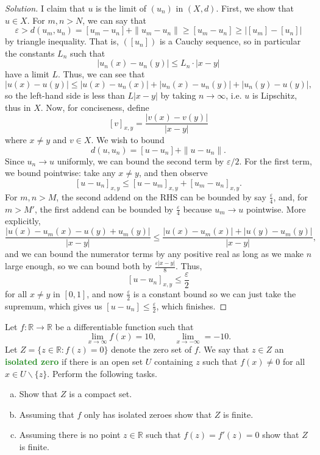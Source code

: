 \documentclass[11pt]{scrartcl}
\providecommand{\eps}{\varepsilon}
\providecommand{\RR}{\mathbb R}
\providecommand{\ii}{\item}
\providecommand{\setdiff}{\smallsetminus}
\newenvironment{soln}{\begin{proof}[Solution]}{\end{proof}}
\providecommand{\vocab}[1]{{\textbf{\textcolor{ForestGreen}{#1}}}}
\begin{document}
\begin{soln}
	I claim that $u$ is the limit of $(u_n)$ in $(X, d)$.
	First, we show that $u\in X$. For $m,n > N$, we can say that
	\[\eps > d(u_m, u_n) = [u_m - u_n] + \|u_m - u_n\|
	\ge [u_m - u_n] \ge |[u_m] - [u_n]|\]
	by triangle inequality. That is, $([u_n])$ is a Cauchy sequence,
	so in particular the constants $L_n$ such that
	\[|u_n(x) - u_n(y)| \le L_n\cdot|x - y|\]
	have a limit $L$. Thus, we can see that
	\[|u(x) - u(y)| \le |u(x) - u_n(x)| + |u_n(x) - u_n(y)|	+ |u_n(y) - u(y)|,\]
	so the left-hand side is less than $L|x - y|$ by taking $n\to\infty$,
	i.e. $u$ is Lipschitz, thus in $X$.
	Now, for conciseness, define
	\[[v]_{x,y} = \frac{|v(x) - v(y)|}{|x - y|}\]
	where $x\ne y$ and $v\in X$.
	We wish to bound
	\[d(u, u_n) = [u - u_n] + \|u - u_n\|.\]
	Since $u_n\to u$ uniformly, we can bound the second term by $\eps/2$.
	For the first term, we bound pointwise: take any $x\ne y$, and then observe
	\[[u - u_n]_{x,y} \le [u - u_m]_{x,y} + [u_m - u_n]_{x,y}.\]
	For $m,n > M$, the second addend on the RHS can be
	bounded by say $\frac\eps4$, and, for $m > M'$, the first addend
	can be bounded by $\frac\eps4$ because $u_m\to u$ pointwise.
	More explicitly,
	\[\frac{|u(x) - u_m(x) - u(y) + u_m(y)|}{|x - y|}
	\le \frac{|u(x) - u_m(x)| + |u(y) - u_m(y)|}{|x - y|},\]
	and we can bound the numerator terms by any positive real
	as long as we make $n$ large enough, so we can bound both by
	$\frac{\eps|x - y|}{8}$. Thus,
	\[[u - u_n]_{x,y} \le \frac\eps2\]
	for all $x\ne y$ in $[0,1]$, and now $\frac\eps2$ is a constant bound
	so we can just take the supremum, which gives us $[u - u_n] \le \frac\eps2$,
	which finishes.
\end{soln}

\pagebreak
\begin{problem}
	Let $f\colon\RR\to\RR$ be a differentiable function such that
	\[\lim_{x\to\infty} f(x) = 10,\qquad \lim_{x\to-\infty} = -10.\]
	Let $Z = \{z\in\RR : f(z) = 0\}$ denote the zero set of $f$.
	We say that $z\in Z$ an \vocab{isolated zero} if there is an open set $U$
	containing $z$ such that $f(x)\ne 0$ for all $x\in U\setdiff\{z\}$.
	Perform the following tasks.
	\begin{enumerate}[(a)]
		\ii Show that $Z$ is a compact set.
		\ii Assuming that $f$ only has isolated zeroes show that $Z$ is finite.
		\ii Assuming there is no point $z\in\RR$ such that $f(z) = f'(z) = 0$
		show that $Z$ is finite.
	\end{enumerate}
\end{problem}
\end{document}

